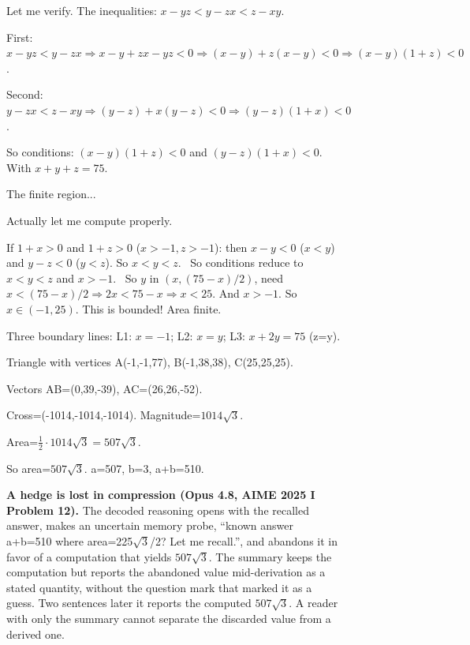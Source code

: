 \begin{figure}[H]
\begin{reasoncol}[equal height group=sfB]
  Let me verify. The inequalities: \(x-yz < y-zx < z-xy\).\par
  First: \(x-yz < y-zx \Rightarrow x-y+zx-yz<0 \Rightarrow (x-y)+z(x-y)<0 \Rightarrow (x-y)(1+z)<0\).\par
  Second: \(y-zx < z-xy \Rightarrow (y-z)+x(y-z)<0 \Rightarrow (y-z)(1+x)<0\).\par
  So conditions: \((x-y)(1+z)<0\) and \((y-z)(1+x)<0\). With \(x+y+z=75\).\par\vspace{2pt}
  The finite region... \par\vspace{2pt}
  Actually let me compute properly. \elide\par\vspace{2pt}
  If \(1+x>0\) and \(1+z>0\) (\(x>-1, z>-1\)): then \(x-y<0\) (\(x<y\)) and \(y-z<0\) (\(y<z\)). So \(x<y<z\). \elide\ So conditions reduce to \(x<y<z\) and \(x>-1\). \elide\ So \(y\) in \((x,(75-x)/2)\), need \(x<(75-x)/2 \Rightarrow 2x<75-x \Rightarrow x<25\). And \(x>-1\). So \(x\in(-1,25)\). This is bounded! Area finite.\par\vspace{2pt}
  Three boundary lines: L1: \(x=-1\); L2: \(x=y\); L3: \(x+2y=75\) (z=y). \elide\par
  Triangle with vertices A(-1,-1,77), B(-1,38,38), C(25,25,25).\par
  Vectors AB=(0,39,-39), AC=(26,26,-52).\par
  Cross=(-1014,-1014,-1014). Magnitude=\(1014\sqrt3\).\par
  Area=\(\tfrac12\cdot1014\sqrt3=507\sqrt3\).\par
  So area=\(507\sqrt3\). a=507, b=3, a+b=510.
\end{reasoncol}
\caption{\textbf{A hedge is lost in compression (Opus 4.8, AIME 2025 I
Problem 12).} The decoded reasoning opens with the recalled answer, makes an
uncertain memory probe, ``known answer a+b=510 where area=225\(\sqrt3\)/2?
Let me recall.'', and abandons it in favor of a computation that yields
\(507\sqrt3\). The summary keeps the computation but reports the abandoned
value mid-derivation as a stated quantity, without the question mark that
marked it as a guess. Two sentences later it reports the computed
\(507\sqrt3\). A reader
with only the summary cannot separate the discarded value from a derived one.}
\label{fig:sf_fabricated_fact}
\end{figure}

